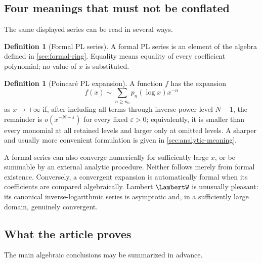 \documentclass[11pt,oneside]{article}
\numberwithin{equation}{section}
\theoremstyle{definition}
\newtheorem{definition}[theorem]{Definition}
\newcommand{\as}{\sim}
\begin{document}
\subsection{Four meanings that must not be conflated}

The same displayed series can be read in several ways.

\begin{definition}[Formal PL series]
A formal PL series is an element of the algebra defined in
\cref{sec:formal-ring}.  Equality means equality of every coefficient polynomial;
no value of \(x\) is substituted.
\end{definition}

\begin{definition}[Poincar\'e PL expansion]
A function \(f\) has the expansion
\[
  f(x)\as\sum_{n\ge n_0}p_n(\log x)x^{-n}
\]
as \(x\to+\infty\) if, after including all terms through inverse-power level
\(N-1\), the remainder is \(o(x^{-N+\varepsilon})\) for every fixed
\(\varepsilon>0\); equivalently, it is smaller than every monomial at all
retained levels and larger only at omitted levels.  A sharper and usually more
convenient formulation is given in \cref{sec:analytic-meaning}.
\end{definition}

A formal series can also converge numerically for sufficiently large \(x\), or
be summable by an external analytic procedure.  Neither follows merely from
formal existence.  Conversely, a convergent expansion is automatically formal
when its coefficients are compared algebraically.  Lambert \(\LambertW\) is unusually
pleasant: its canonical inverse-logarithmic series is asymptotic and, in a
sufficiently large domain, genuinely convergent.

\subsection{What the article proves}

The main algebraic conclusions may be summarized in advance.
\end{document}
